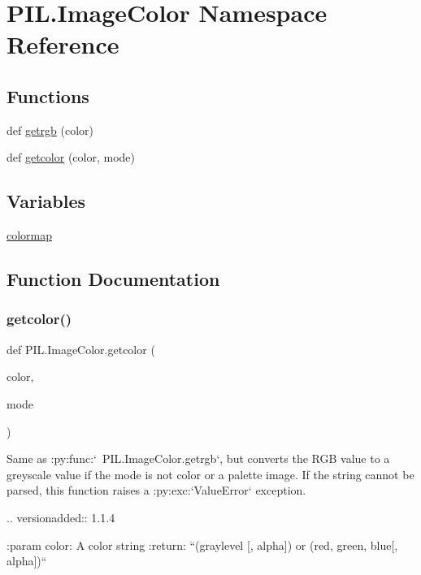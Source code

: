 \hypertarget{namespacePIL_1_1ImageColor}{}\section{P\+I\+L.\+Image\+Color Namespace Reference}
\label{namespacePIL_1_1ImageColor}
\subsection*{Functions}
\begin{DoxyCompactItemize}
\item 
def \hyperlink{namespacePIL_1_1ImageColor_a820cac728f43ad09c71a5e0ebf459ef0}{getrgb} (color)
\item 
def \hyperlink{namespacePIL_1_1ImageColor_a9c50e605220bf3d9c2f5140a00977c7d}{getcolor} (color, mode)
\end{DoxyCompactItemize}
\subsection*{Variables}
\begin{DoxyCompactItemize}
\item 
\hyperlink{namespacePIL_1_1ImageColor_a7762e8540878b08633ccd38bf0494a9c}{colormap}
\end{DoxyCompactItemize}


\subsection{Function Documentation}
\mbox{\label{namespacePIL_1_1ImageColor_a9c50e605220bf3d9c2f5140a00977c7d}} 
\subsubsection{\texorpdfstring{getcolor()}{getcolor()}}
{\footnotesize\ttfamily def P\+I\+L.\+Image\+Color.\+getcolor (\begin{DoxyParamCaption}\item[{}]{color,  }\item[{}]{mode }\end{DoxyParamCaption})}

\begin{DoxyVerb}Same as :py:func:`~PIL.ImageColor.getrgb`, but converts the RGB value to a
greyscale value if the mode is not color or a palette image. If the string
cannot be parsed, this function raises a :py:exc:`ValueError` exception.

.. versionadded:: 1.1.4

:param color: A color string
:return: ``(graylevel [, alpha]) or (red, green, blue[, alpha])``
\end{DoxyVerb}
 \mbox{\label{namespacePIL_1_1ImageColor_a820cac728f43ad09c71a5e0ebf459ef0}} 
